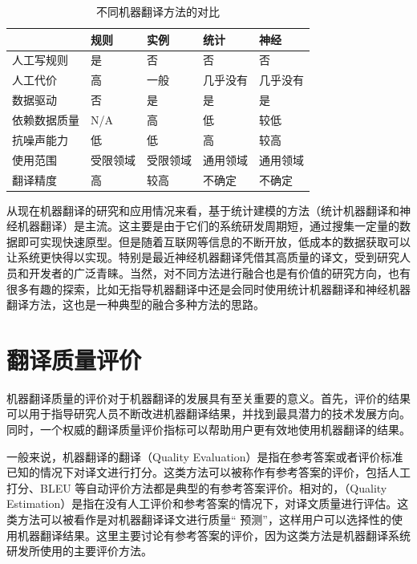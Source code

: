 \begin{table}[htp]{
\begin{center}
\caption{不同机器翻译方法的对比}
\label{tab:comparison-of-different-MT}
\begin{tabular}{l | l l l l}
& \parbox{3.8em}{规则} & \parbox{3.8em}{实例} & \parbox{3.8em}{统计} & \parbox{3.8em}
{神经} \\
\hline

人工写规则 & 是 & 否 & 否 & 否\\
人工代价 & 高 & 一般 & 几乎没有 & 几乎没有 \\
数据驱动 & 否 & 是 & 是 & 是\\
依赖数据质量 & N/A & 高 & 低 & 较低\\
抗噪声能力 & 低 & 低 & 高 & 较高 \\
使用范围 & 受限领域 & 受限领域 & 通用领域 & 通用领域 \\
翻译精度 & 高 & 较高 & 不确定 & 不确定 \\
\end{tabular}
\end{center}
\label{tab:1-1}
}\end{table}

\parinterval 从现在机器翻译的研究和应用情况来看，基于统计建模的方法（统计机器翻译和神经机器翻译）是主流。这主要是由于它们的系统研发周期短，通过搜集一定量的数据即可实现快速原型。但是随着互联网等信息的不断开放，低成本的数据获取可以让系统更快得以实现。特别是最近神经机器翻译凭借其高质量的译文，受到研究人员和开发者的广泛青睐。当然，对不同方法进行融合也是有价值的研究方向，也有很多有趣的探索，比如无指导机器翻译中还是会同时使用统计机器翻译和神经机器翻译方法，这也是一种典型的融合多种方法的思路。


\sectionnewpage
\section{翻译质量评价}

\parinterval 机器翻译质量的评价对于机器翻译的发展具有至关重要的意义。首先，评价的结果可以用于指导研究人员不断改进机器翻译结果，并找到最具潜力的技术发展方向。同时，一个权威的翻译质量评价指标可以帮助用户更有效地使用机器翻译的结果。

\parinterval 一般来说，机器翻译的翻译{\small{}}（Quality Evaluation）是指在参考答案或者评价标准已知的情况下对译文进行打分。这类方法可以被称作有参考答案的评价，包括人工打分、BLEU 等自动评价方法都是典型的有参考答案评价。相对的，{\small{}}（Quality Estimation）是指在没有人工评价和参考答案的情况下，对译文质量进行评估。这类方法可以被看作是对机器翻译译文进行质量`` 预测''，这样用户可以选择性的使用机器翻译结果。这里主要讨论有参考答案的评价，因为这类方法是机器翻译系统研发所使用的主要评价方法。

